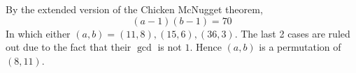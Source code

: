 By the extended version of the Chicken McNugget theorem,
$$(a-1)(b-1)=70$$
In which either $(a,b)=(11,8), (15, 6), (36, 3)$. The last 2 cases are ruled out
due to the fact that their $\gcd$ is not $1$. Hence $(a,b)$ is a permutation of $(8,11)$.
